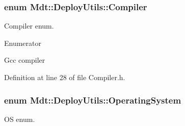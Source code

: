 \subsubsection[{\texorpdfstring{Compiler}{Compiler}}]{\setlength{\rightskip}{0pt plus 5cm}enum {\bf Mdt\+::\+Deploy\+Utils\+::\+Compiler}\hspace{0.3cm}{\ttfamily [strong]}}\hypertarget{namespace_mdt_1_1_deploy_utils_aabc55fa0829b602f94e42f55f66173e3}{}\label{namespace_mdt_1_1_deploy_utils_aabc55fa0829b602f94e42f55f66173e3}


Compiler enum. 

\begin{Desc}
\item[Enumerator]\par
\begin{description}
\item[{\em 
Gcc\hypertarget{namespace_mdt_1_1_deploy_utils_aabc55fa0829b602f94e42f55f66173e3aedfa57e7c7b4dd9a9d4a55087e5ac1a9}{}\label{namespace_mdt_1_1_deploy_utils_aabc55fa0829b602f94e42f55f66173e3aedfa57e7c7b4dd9a9d4a55087e5ac1a9}
}]Gcc compiler \end{description}
\end{Desc}


Definition at line 28 of file Compiler.\+h.

\subsubsection[{\texorpdfstring{Operating\+System}{OperatingSystem}}]{\setlength{\rightskip}{0pt plus 5cm}enum {\bf Mdt\+::\+Deploy\+Utils\+::\+Operating\+System}\hspace{0.3cm}{\ttfamily [strong]}}\hypertarget{namespace_mdt_1_1_deploy_utils_a998c3ae583084b7cac9e9a71b9e1ac32}{}\label{namespace_mdt_1_1_deploy_utils_a998c3ae583084b7cac9e9a71b9e1ac32}


OS enum. 


